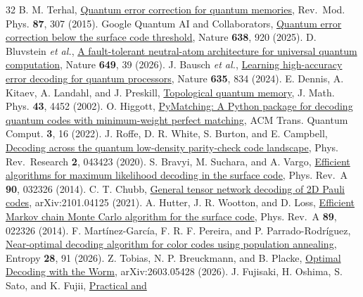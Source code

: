 \documentclass[aps,prapplied,reprint,superscriptaddress,amsmath,amssymb,floatfix,nofootinbib]{revtex4-2}
\begin{document}
\begin{thebibliography}{32}
 B. M. Terhal, \href{https://doi.org/10.1103/RevModPhys.87.307}{Quantum
  error correction for quantum memories}, Rev.~Mod. Phys. \textbf{87},
  307 (2015).
 Google Quantum AI and Collaborators,
  \href{https://doi.org/10.1038/s41586-024-08449-y}{Quantum error
  correction below the surface code threshold}, Nature \textbf{638}, 920
  (2025).
 D. Bluvstein \emph{et al.},
  \href{https://doi.org/10.1038/s41586-025-09848-5}{A fault-tolerant
  neutral-atom architecture for universal quantum computation}, Nature
  \textbf{649}, 39 (2026).
 J. Bausch \emph{et al.},
  \href{https://doi.org/10.1038/s41586-024-08148-8}{Learning
  high-accuracy error decoding for quantum processors}, Nature
  \textbf{635}, 834 (2024).
 E. Dennis, A. Kitaev, A. Landahl, and J. Preskill,
  \href{https://doi.org/10.1063/1.1499754}{Topological quantum memory},
  J. Math. Phys. \textbf{43}, 4452 (2002).
 O. Higgott, \href{https://doi.org/10.1145/3505637}{PyMatching: A
  Python package for decoding quantum codes with minimum-weight perfect
  matching}, ACM Trans. Quantum Comput. \textbf{3}, 16 (2022).
 J. Roffe, D. R. White, S. Burton, and E. Campbell,
  \href{https://doi.org/10.1103/PhysRevResearch.2.043423}{Decoding
  across the quantum low-density parity-check code landscape}, Phys.
  Rev.~Research \textbf{2}, 043423 (2020).
 S. Bravyi, M. Suchara, and A. Vargo,
  \href{https://doi.org/10.1103/PhysRevA.90.032326}{Efficient algorithms
  for maximum likelihood decoding in the surface code}, Phys. Rev.~A
  \textbf{90}, 032326 (2014).
 C. T. Chubb, \href{https://arxiv.org/abs/2101.04125}{General tensor
  network decoding of 2D Pauli codes}, arXiv:2101.04125 (2021).
 A. Hutter, J. R. Wootton, and D. Loss,
  \href{https://doi.org/10.1103/PhysRevA.89.022326}{Efficient Markov
  chain Monte Carlo algorithm for the surface code}, Phys. Rev.~A
  \textbf{89}, 022326 (2014).
 F. Martínez-García, F. R. F. Pereira, and P. Parrado-Rodríguez,
  \href{https://doi.org/10.3390/e28010091}{Near-optimal decoding
  algorithm for color codes using population annealing}, Entropy
  \textbf{28}, 91 (2026).
 Z. Tobias, N. P. Breuckmann, and B. Placke,
  \href{https://arxiv.org/abs/2603.05428}{Optimal Decoding with the
  Worm}, arXiv:2603.05428 (2026).
 J. Fujisaki, H. Oshima, S. Sato, and K. Fujii,
  \href{https://doi.org/10.1103/PhysRevResearch.4.043086}{Practical and
}
\end{thebibliography}
\end{document}
